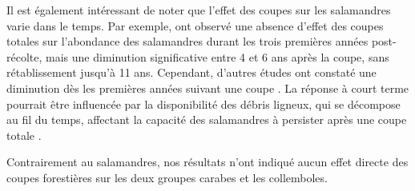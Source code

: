Il est également intéressant de noter que l'effet des coupes sur les salamandres varie dans le temps. 
Par exemple, \cite{Ochs2022Responseterrestrial} ont observé une absence d'effet des coupes totales sur l'abondance des salamandres durant les trois premières années post-récolte, 
mais une diminution significative entre 4 et 6 ans après la coupe, sans rétablissement jusqu'à 11 ans. 
Cependant, d'autres études ont constaté une diminution dès les premières années suivant une coupe \citep{deMaynadier1995relationshipforest,Macneil2014Effectstimber}. 
La réponse à court terme pourrait être influencée par la disponibilité des débris ligneux, qui se décompose au fil du temps, affectant la capacité des salamandres à persister après une coupe totale \citep{Ochs2022Responseterrestrial}. 



Contrairement au salamandres, nos résultats n'ont indiqué aucun effet directe des coupes forestières sur les deux groupes carabes et les collemboles. 

